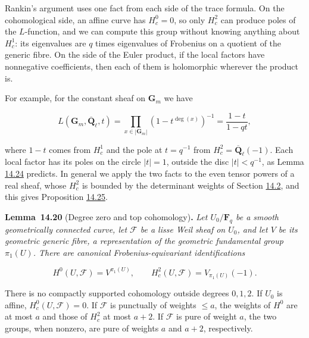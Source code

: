 \documentclass[11pt]{article}
\newenvironment{bpstatement}[2]{\par\addvspace{0.6\baselineskip}\noindent\textbf{#1}#2\textbf{.}\enspace\ignorespaces}
  {\par\addvspace{0.4\baselineskip}}
\newenvironment{bpstatementit}[2]{\begin{bpstatement}{#1}{#2}\itshape\ignorespaces}{\end{bpstatement}}
\begin{document}
Rankin's argument uses one fact from each side of the trace formula. On the cohomological side, an affine curve has \(H^0_c=0\), so only \(H^2_c\) can produce poles of the \(L\)-function, and we can compute this group without knowing anything about \(H^1_c\): its eigenvalues are \(q\) times eigenvalues of Frobenius on a quotient of the generic fibre. On the side of the Euler product, if the local factors have nonnegative coefficients, then each of them is holomorphic wherever the product is.

For example, for the constant sheaf on \(\mathbf G_m\) we have

\[
L(\mathbf G_m,\overline{\mathbf Q}_\ell,t)=\prod_{x\in|\mathbf G_m|}(1-t^{\deg(x)})^{-1}
=\frac{1-t}{1-qt},
\]

where \(1-t\) comes from \(H^1_c\) and the pole at \(t=q^{-1}\) from \(H^2_c=\overline{\mathbf Q}_\ell(-1)\). Each local factor has its poles on the circle \(|t|=1\), outside the disc \(|t|<q^{-1}\), as Lemma \hyperref[bp113]{14.24} predicts. In general we apply the two facts to the even tensor powers of a real sheaf, whose \(H^2_c\) is bounded by the determinant weights of Section \hyperref[bp69]{14.2}, and this gives Proposition \hyperref[bp116]{14.25}.

\label{bp104}%
\begin{bpstatementit}{Lemma~14.20}{ (Degree zero and top cohomology)}
Let \(U_0/\mathbf F_q\) be a smooth geometrically connected curve, let \(\mathcal F\) be a lisse Weil sheaf on \(U_0\), and let \(V\) be its geometric generic fibre, a representation of the geometric fundamental group \(\pi_1(U)\).  There are canonical Frobenius-equivariant identifications

\[
H^0(U,\mathcal F)=V^{\pi_1(U)},\qquad
H_c^2(U,\mathcal F)=V_{\pi_1(U)}(-1).
\]

There is no compactly supported cohomology outside degrees \(0,1,2\). If \(U_0\) is affine, \(H_c^0(U,\mathcal F)=0\). If \(\mathcal F\) is punctually of weights \(\le a\), the weights of \(H^0\) are at most \(a\) and those of \(H_c^2\) at most \(a+2\).  If \(\mathcal F\) is pure of weight \(a\), the two groups, when nonzero, are pure of weights \(a\) and \(a+2\), respectively.
\end{bpstatementit}
\end{document}
